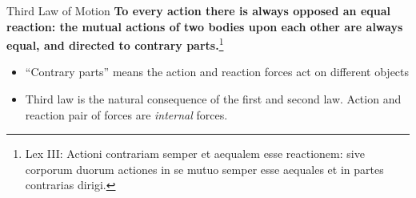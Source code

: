 \documentclass[12pt,compress,aspectratio=169]{beamer}
\newcommand{\mb}[1]{\ensuremath\mathbf{#1}}
\newcommand{\eq}[2]{\vspace{#1}{\Large\begin{displaymath}#2\end{displaymath}}}
\begin{document}
\begin{frame}{Third Law of Motion}
  \textbf{To every action there is always opposed an equal reaction: the
    mutual actions of two bodies upon each other are always equal, and directed
    to contrary parts.}\footnote{Lex III: Actioni contrariam semper et aequalem
    esse reactionem: sive corporum duorum actiones in se mutuo semper esse
    aequales et in partes contrarias dirigi.}
 

  \eq{-.2in}{
    \boxed{\mb{F}_{\text{AB}} = -\mb{F}_{\text{BA}}}
  }
  \begin{itemize}
  \item ``Contrary parts'' means the action and reaction forces act on
    different objects
  \item Third law is the natural consequence of the first and second law.
    Action and reaction pair of forces are \emph{internal} forces.
  \end{itemize}
  \vspace{.2in}
\end{frame}


%  
\end{document}
